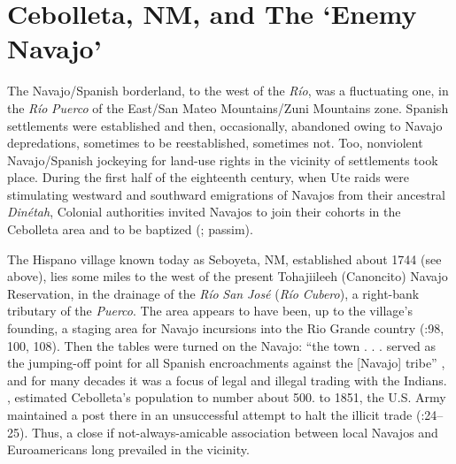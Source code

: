 \section{\textbf{Cebolleta,} \textbf{NM,} \textbf{and} \textbf{The} \textbf{‘Enemy} \textbf{Navajo’}}

The Navajo/Spanish borderland, to the west of the \textit{Río}, was a fluctuating one, in the \textit{Río} \textit{Puerco} of the East/San Mateo Mountains/Zuni Mountains zone.  Spanish settlements were established and then, occasionally, abandoned owing to Navajo depredations, sometimes to be reestablished, sometimes not.  Too, nonviolent Navajo/Spanish jockeying for land-use rights in the vicinity of settlements took place.  During the first half of the eighteenth century, when Ute raids were stimulating westward and southward emigrations of Navajos from their ancestral \textit{Dinétah}, Colonial authorities invited Navajos to join their cohorts in the Cebolleta area and to be baptized (\citealt{Reeve1971a}; \citealt{Acrey1988} passim).

  The Hispano village known today as Seboyeta, NM, established about 1744 (see above), lies some miles to the west of the present Tohajiileeh (Canoncito) Navajo Reservation, in the drainage of the \textit{Río} \textit{San} \textit{José} (\textit{Río} \textit{Cubero}), a right-bank tributary of the \textit{Puerco}.  The area appears to have been, up to the village’s founding, a staging area for Navajo incursions into the Rio Grande country (\citealt{Acrey1988}:98, 100, 108).  Then the tables were turned on the Navajo: “the town . . . served as the jumping-off point for all Spanish encroachments against the [Navajo] tribe” \citep[77]{Bailey1966}, and for many decades it was a focus of legal and illegal trading with the Indians.  \citealt{In1846}, \citet[27]{Robinson1848} estimated Cebolleta’s population to number about 500.  \citealt{From1849} to 1851, the U.S. Army maintained a post there in an unsuccessful attempt to halt the illicit trade (\citealt{Bailey1964b}:24–25).  Thus, a close if not-always-amicable association between local Navajos and Euroamericans long prevailed in the vicinity.

